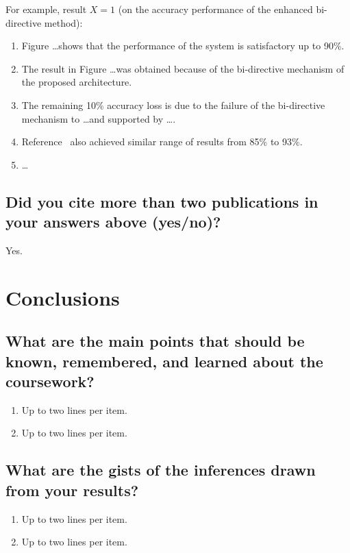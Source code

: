 For example, result $X = 1$ (on the accuracy performance of the enhanced bi-directive method):

\begin{enumerate}
	\item Figure \ldots shows that the performance of the system is satisfactory up to 90\%.
	\item The result in Figure \ldots was obtained because of the bi-directive mechanism of the proposed architecture.
	\item The remaining 10\% accuracy loss is due to the failure of the bi-directive mechanism to \ldots and supported by \ldots.
	\item Reference~\cite{Einstein1905} also achieved similar range of results from 85\% to 93\%.
	\item \ldots
\end{enumerate}

\subsection{Did you cite more than two publications in your answers above (yes/no)?}
Yes.	



















\section{Conclusions}
\label{sec:conc}

\subsection{What are the main points that should be known, remembered, and learned about the coursework?}
\begin{enumerate}
	\item Up to two lines per item.
	\item Up to two lines per item.
\end{enumerate}

\subsection{What are the gists of the inferences drawn from your results?}
\begin{enumerate}
	\item Up to two lines per item.
	\item Up to two lines per item.
\end{enumerate}

